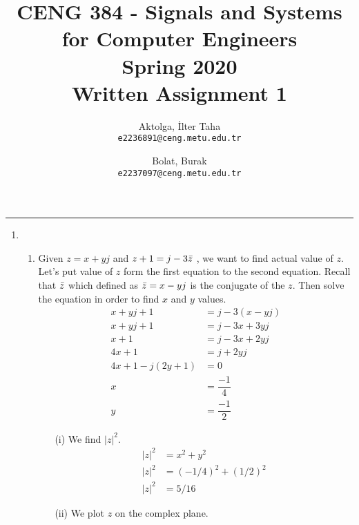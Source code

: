 \documentclass[10pt,a4paper, margin=1in]{article}
\author{
  Aktolga, İlter Taha\\
  \texttt{e2236891@ceng.metu.edu.tr}
  \and
  Bolat, Burak\\
  \texttt{e2237097@ceng.metu.edu.tr}
}
\title{CENG 384 - Signals and Systems for Computer Engineers \\
Spring 2020 \\
Written Assignment 1}
\begin{document}
\maketitle



\noindent\rule{19cm}{1.2pt}

\begin{enumerate}

\item 
    \begin{enumerate}
    \item %
    Given $z = x + yj $ and $z + 1 = j - 3\Bar{z}$ , we want to find actual value of $z$. Let's put value of $z$ form the first equation to the second equation.
    Recall that  $\Bar{z}$ which defined as $\Bar{z} = x - yj$ is the conjugate of the $z$.
    Then solve the equation in order to find $x$ and $y$ values.
    \begin{equation}
	\begin{split}
		x+yj+1 & = j - 3(x-yj)\\
		x+yj+1 & = j - 3x+3yj\\
		x+1 & = j-3x+2yj\\
		4x + 1 & = j + 2yj \\
		4x+1 -j(2y+1) & = 0\\
		x & = \dfrac{-1}{4}\\
		y & = \dfrac{-1}{2}
	\end{split}
	\end{equation}
	
	\begin{itemize}
		\item[(i)] We find $|z|^2$.
            		\begin{equation}
	       	 	\begin{split}
        				|z|^2 & = x^2 + y^2\\
        				|z|^2 & = (-1/4)^2 + (1/2)^2\\
        				|z|^2 & = 5/16
	        		\end{split}
       		 	\end{equation}
		\item[(ii)] We plot $z$ on the complex plane. \\
		\\
\end{itemize}
\end{enumerate}
\end{enumerate}
\end{document}
